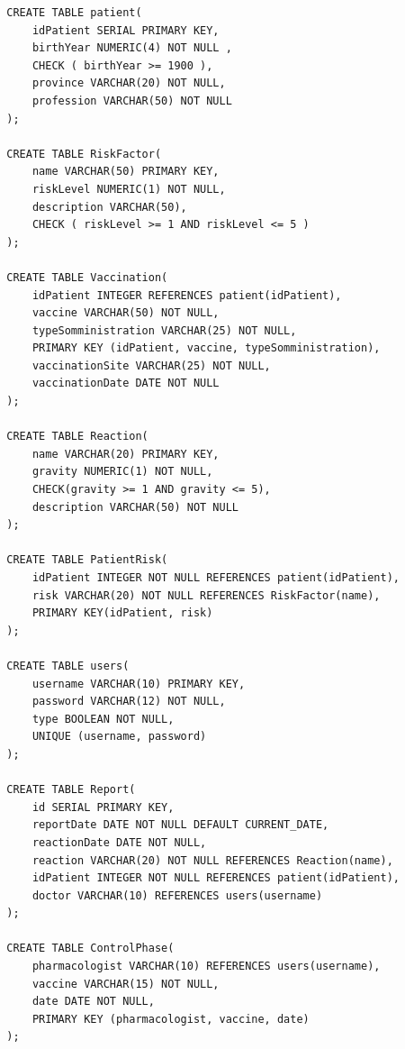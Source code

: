 \documentclass[11pt]{article}
\begin{document}
        \begin{verbatim}
        CREATE TABLE patient(
            idPatient SERIAL PRIMARY KEY,
            birthYear NUMERIC(4) NOT NULL ,
            CHECK ( birthYear >= 1900 ),
            province VARCHAR(20) NOT NULL,
            profession VARCHAR(50) NOT NULL
        );
        
        CREATE TABLE RiskFactor(
            name VARCHAR(50) PRIMARY KEY,
            riskLevel NUMERIC(1) NOT NULL,
            description VARCHAR(50),
            CHECK ( riskLevel >= 1 AND riskLevel <= 5 )
        );
        
        CREATE TABLE Vaccination(
            idPatient INTEGER REFERENCES patient(idPatient),
            vaccine VARCHAR(50) NOT NULL,
            typeSomministration VARCHAR(25) NOT NULL,
            PRIMARY KEY (idPatient, vaccine, typeSomministration),
            vaccinationSite VARCHAR(25) NOT NULL,
            vaccinationDate DATE NOT NULL
        );
        
        CREATE TABLE Reaction(
            name VARCHAR(20) PRIMARY KEY,
            gravity NUMERIC(1) NOT NULL,
            CHECK(gravity >= 1 AND gravity <= 5),
            description VARCHAR(50) NOT NULL
        );
        
        CREATE TABLE PatientRisk(
            idPatient INTEGER NOT NULL REFERENCES patient(idPatient),
            risk VARCHAR(20) NOT NULL REFERENCES RiskFactor(name),
            PRIMARY KEY(idPatient, risk)
        );
        
        CREATE TABLE users(
            username VARCHAR(10) PRIMARY KEY,
            password VARCHAR(12) NOT NULL,
            type BOOLEAN NOT NULL,
            UNIQUE (username, password)
        );
        
        CREATE TABLE Report(
            id SERIAL PRIMARY KEY,
            reportDate DATE NOT NULL DEFAULT CURRENT_DATE,
            reactionDate DATE NOT NULL,
            reaction VARCHAR(20) NOT NULL REFERENCES Reaction(name),
            idPatient INTEGER NOT NULL REFERENCES patient(idPatient),
            doctor VARCHAR(10) REFERENCES users(username)
        );
        
        CREATE TABLE ControlPhase(
            pharmacologist VARCHAR(10) REFERENCES users(username),
            vaccine VARCHAR(15) NOT NULL,
            date DATE NOT NULL,
            PRIMARY KEY (pharmacologist, vaccine, date)
        );
        \end{verbatim}
    
\end{document}
